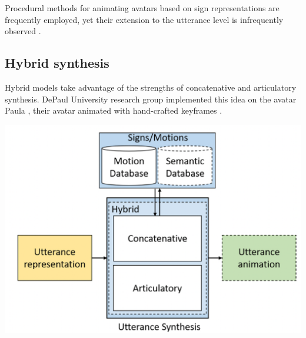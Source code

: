 Procedural methods for animating avatars based on sign representations are frequently employed, yet their extension to the utterance level is infrequently observed \parencite{naert2020survey}.


\subsection{Hybrid synthesis}

Hybrid models take advantage of the strengths of concatenative and articulatory synthesis. DePaul University research group implemented this idea on the avatar Paula \parencite{heloir2010real}, their avatar animated with hand-crafted keyframes \parencite{naert2020survey}.


\includegraphics[width=\textwidth]{figures/utterancesynthesis.png}

